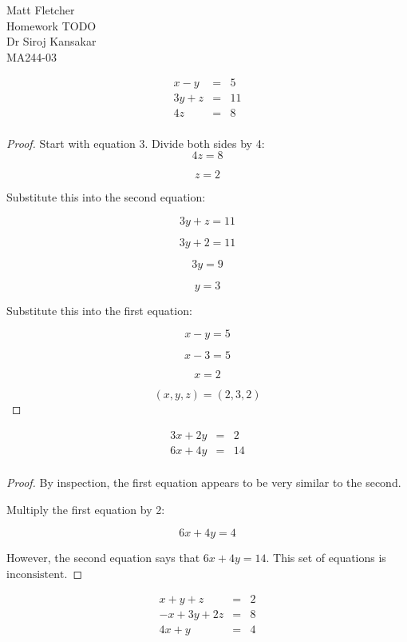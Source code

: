 \documentclass[8pt]{article}
\newenvironment{problem}[2][Problem]{\begin{trivlist}
\item[\hskip \labelsep {\bfseries #1}\hskip \labelsep {\bfseries #2.}]}{\end{trivlist}}
\begin{document}
 

 
Matt Fletcher
\\Homework TODO
\\Dr Siroj Kansakar
\\MA244-03

 
\begin{problem}{1.1.28}
\[
\begin{array}
	 {rcr} x-y & = & 5 \\ 
	     3y+z & = & 11 \\
       	4z  & = & 8 \\
\end{array}
\]
\end{problem}
 
\begin{proof}
Start with equation 3. Divide both sides by 4: \\
\[4z=8\]

\[\boxed{z=2}\]

Substitute this into the second equation:

\[3y+z = 11\]

\[3y+2=11\]

\[3y=9\]

\[\boxed{y=3}\]

Substitute this into the first equation:

\[x-y=5\]

\[x-3=5\]

\[\boxed{x=2}\]

\[\boxed{(x,y,z)=(2,3,2)}\]
\end{proof}



\begin{problem}{1.1.38}
	\[
	\begin{array}
	{lcr} 3x+2y & = & 2 \\ 
	6x+4y & = & 14 \\
	\end{array}
	\]
\end{problem}

\begin{proof}
	By inspection, the first equation appears to be very similar to the second. 
	
	Multiply the first equation by 2:
	
	\[6x+4y = 4\]
	
	However, the second equation says that $6x+4y = 14$. This set of equations is $\boxed{\text{inconsistent}}$.
\end{proof}

\begin{problem}{1.1.48}
\[	
	\begin{array}
	{lcr} 
	x+y+z& = & 2 \\ 
	-x+3y+2z & = & 8 \\
	4x+y & = & 4 \\
	\end{array}
\]
\end{problem}
\end{document}
